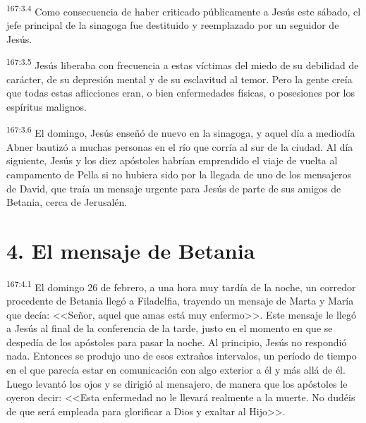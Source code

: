 \par 
\textsuperscript{167:3.4} Como consecuencia de haber criticado públicamente a Jesús este sábado, el jefe principal de la sinagoga fue destituido y reemplazado por un seguidor de Jesús.

\par 
\textsuperscript{167:3.5} Jesús liberaba con frecuencia a estas víctimas del miedo de su debilidad de carácter, de su depresión mental y de su esclavitud al temor. Pero la gente creía que todas estas aflicciones eran, o bien enfermedades físicas, o posesiones por los espíritus malignos.

\par 
\textsuperscript{167:3.6} El domingo, Jesús enseñó de nuevo en la sinagoga, y aquel día a mediodía Abner bautizó a muchas personas en el río que corría al sur de la ciudad. Al día siguiente, Jesús y los diez apóstoles habrían emprendido el viaje de vuelta al campamento de Pella si no hubiera sido por la llegada de uno de los mensajeros de David, que traía un mensaje urgente para Jesús de parte de sus amigos de Betania, cerca de Jerusalén.

\section*{4. El mensaje de Betania}
\par 
\textsuperscript{167:4.1} El domingo 26 de febrero, a una hora muy tardía de la noche, un corredor procedente de Betania llegó a Filadelfia, trayendo un mensaje de Marta y María que decía: <<Señor, aquel que amas está muy enfermo>>. Este mensaje le llegó a Jesús al final de la conferencia de la tarde, justo en el momento en que se despedía de los apóstoles para pasar la noche. Al principio, Jesús no respondió nada. Entonces se produjo uno de esos extraños intervalos, un período de tiempo en el que parecía estar en comunicación con algo exterior a él y más allá de él. Luego levantó los ojos y se dirigió al mensajero, de manera que los apóstoles le oyeron decir: <<Esta enfermedad no le llevará realmente a la muerte. No dudéis de que será empleada para glorificar a Dios y exaltar al Hijo>>.

